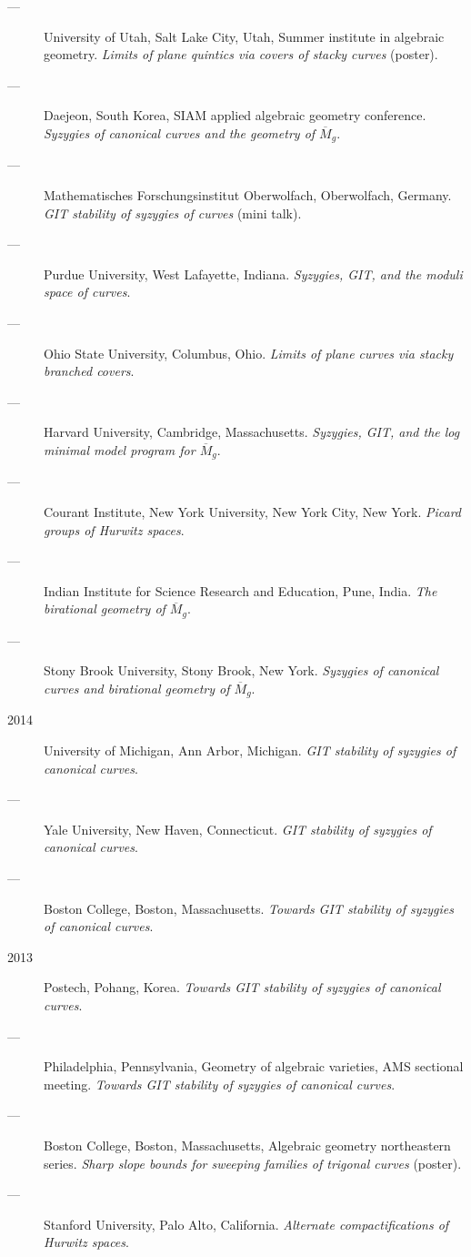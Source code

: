 \documentclass[11pt]{article}
\begin{document}
\begin{description}
\item[{---}] University of Utah, Salt Lake City, Utah, Summer institute in algebraic geometry. \emph{Limits of plane quintics via covers of stacky curves} (poster).
\item[{---}] Daejeon, South Korea, SIAM applied algebraic geometry conference. \emph{Syzygies of canonical curves and the geometry of \(\overline M_g\)}.
\item[{---}] Mathematisches Forschungsinstitut Oberwolfach, Oberwolfach, Germany. \emph{GIT stability of syzygies of curves} (mini talk).
\item[{---}] Purdue University, West Lafayette, Indiana. \emph{Syzygies, GIT, and the moduli space of curves}.
\item[{---}] Ohio State University, Columbus, Ohio. \emph{Limits of plane curves via stacky branched covers}.
\item[{---}] Harvard University, Cambridge, Massachusetts. \emph{Syzygies, GIT, and the log minimal model program for \(\overline{M}_g\)}.
\item[{---}] Courant Institute, New York University, New York City, New York. \emph{Picard groups of Hurwitz spaces}.
\item[{---}] Indian Institute for Science Research and Education, Pune, India. \emph{The birational geometry of \(\overline M_g\)}.
\item[{---}] Stony Brook University, Stony Brook, New York. \emph{Syzygies of canonical curves and birational geometry of \(\overline M_g\)}.
\item[{2014}] University of Michigan, Ann Arbor, Michigan. \emph{GIT stability of syzygies of canonical curves}.
\item[{---}] Yale University, New Haven, Connecticut. \emph{GIT stability of syzygies of canonical curves}.
\item[{---}] Boston College, Boston, Massachusetts. \emph{Towards GIT stability of syzygies of canonical curves}.
\item[{2013}] Postech, Pohang, Korea. \emph{Towards GIT stability of syzygies of canonical curves}.
\item[{---}] Philadelphia, Pennsylvania, Geometry of algebraic varieties, AMS sectional meeting. \emph{Towards GIT stability of syzygies of canonical curves}.
\item[{---}] Boston College, Boston, Massachusetts, Algebraic geometry northeastern series. \emph{Sharp slope bounds for sweeping families of trigonal curves} (poster).
\item[{---}] Stanford University, Palo Alto, California. \emph{Alternate compactifications of Hurwitz spaces}.

\end{description}
\end{document}
